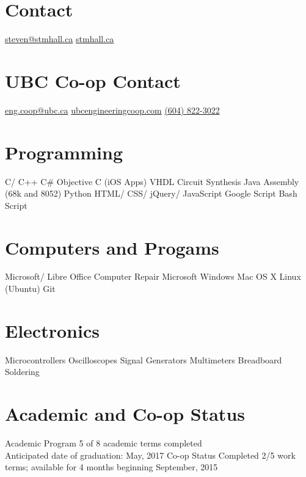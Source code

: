 \documentclass[]{friggeri-cv} %
\begin{document}


\begin{aside} %
\section{Contact}
\href{mailto:steven@stmhall.ca}{steven@stmhall.ca}
\href{http://stmhall.ca}{stmhall.ca}
\section{UBC Co-op Contact}
\href{mailto:eng.coop@ubc.ca}{eng.coop@ubc.ca}
\href{http://www.ubcengineeringcoop.com}{ubcengineeringcoop.com}
\href{tel:604-822-3022}{(604) 822-3022}
\section{Programming}
C/ C++
C\#
Objective C (iOS Apps)
VHDL Circuit Synthesis
Java
Assembly (68k and 8052)
Python
HTML/ CSS/ jQuery/ JavaScript
Google Script
Bash Script
\section{Computers and Progams}
Microsoft/ Libre Office
Computer Repair
Microsoft Windows
Mac OS X
Linux (Ubuntu)
Git
\section{Electronics}
Microcontrollers
Oscilloscopes
Signal Generators
Multimeters
Breadboard
Soldering
\end{aside}

\section{Academic and Co-op Status}

\begin{entrylist}

\entry
{}
{Academic Program}
{}
{5 of 8 academic terms completed\\
Anticipated date of graduation: May, 2017
}
\entry
{}
{Co-op Status}
{}
{Completed 2/5 work terms; available for 4 months beginning September,
2015
}
\end{entrylist}
\end{document}
